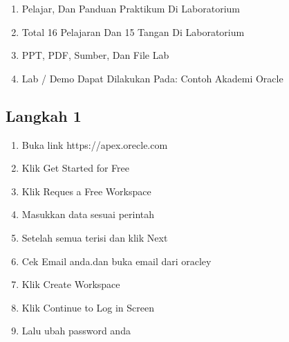 \documentclass{article}
\begin{document}
\usepackage{Apakah Anda Seorang Siswa Atau Guru SQL, Database Relasional, atau Pengembangan Aplikasi, Anda Dapat Menggunakan Oracle Apex Untuk Sangat Memperkaya Pengalaman Pendidikan Anda?}

\usepackage{Setelah Anda Mahir Mengembangkan Aplikasi APEX, Anda Dapat Mengikuti Ujian Sertifikasi Oracle Menjadi Aplikasi Oracle Express 18: Profesional Bersertifikat Pengembang. Menonjol Di Antara Rekan-Rekan Anda, Dan Buktikan Kepada Semua Orang Bahwa Anda Tahu Cara Membangun Aplikasi Yang Kuat Dengan Menggunakan Apex.}

\begin{enumerate}
    \item Pelajar, Dan Panduan Praktikum Di Laboratorium
    \item Total 16 Pelajaran Dan 15 Tangan Di Laboratorium
    \item PPT, PDF, Sumber, Dan File Lab
    \item Lab / Demo Dapat Dilakukan Pada: Contoh Akademi Oracle
    \end{enumerate}
    
\usepackage{Lab Ini Menuntun Anda Saat Mengunggah Spreadsheet Ke Tabel Database Oracle, Lalu Membuat Aplikasi Berdasarkan Tabel Baru Ini.  Anda Kemudian Akan Bermain Dengan Laporan Interaktif Dan Meningkatkan Formulir Terlampir.  Terakhir, Anda Akan Menambahkan Halaman Kalender Dan Kemudian Menautkannya Ke Halaman Formulir Yang Ada.  Alih-Alih Mencoba Mengirim Surel Spreadsheet Untuk Mengumpulkan Informasi Dari Orang Yang Berbeda, Cukup Buat Aplikasi Dalam Hitungan Menit, Dan Kirim Surel URL.  Spreadsheet Sumber-Kebenaran-Tunggal, Multi-Pengguna, Aman, Dan Mudah Tersiram Ini!  Aplikasi Scren Jadi Lebih Baik}

\subsection{Langkah 1}
\begin{enumerate}
    \item Buka link https://apex.orecle.com
    \item Klik Get Started for Free
    \item Klik Reques a Free Workspace
    \item Masukkan data sesuai perintah 
    \item Setelah semua terisi dan klik Next
    \item Cek Email anda.dan buka email dari oracley
    \item Klik Create Workspace
    \item Klik Continue to Log in Screen
    \item Lalu ubah password anda
    \end{enumerate}
\end{document}
